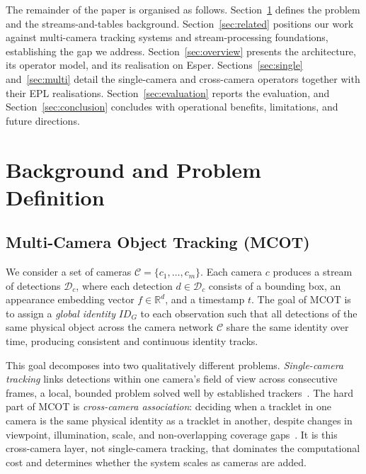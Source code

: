 \documentclass[5p,times]{elsarticle}
\begin{document}
The remainder of the paper is organised as follows. Section~\ref{sec:background} defines the
problem and the streams-and-tables background. Section~\ref{sec:related} positions our work
against multi-camera tracking systems and stream-processing foundations, establishing the gap
we address. Section~\ref{sec:overview} presents the architecture, its operator model, and its
realisation on Esper. Sections~\ref{sec:single} and~\ref{sec:multi} detail the single-camera
and cross-camera operators together with their EPL realisations.
Section~\ref{sec:evaluation} reports the evaluation, and Section~\ref{sec:conclusion} concludes
with operational benefits, limitations, and future directions.

\section{Background and Problem Definition}\label{sec:background}

\subsection{Multi-Camera Object Tracking (MCOT)}
\label{sec:background:mcot}

We consider a set of cameras $\mathcal{C} = \{c_1,\dots,c_m\}$. Each camera $c$ produces a stream of detections $\mathcal{D}_c$, where each detection $d \in \mathcal{D}_c$ consists of a bounding box, an appearance embedding vector $f \in \mathbb{R}^{d}$, and a timestamp $t$. The goal of MCOT is to assign a \emph{global identity} $ID_G$ to each observation such that all detections of the same physical object across the camera network $\mathcal{C}$ share the same identity over time, producing consistent and continuous identity tracks.

This goal decomposes into two qualitatively different problems. \emph{Single-camera tracking} links detections within one camera's field of view across consecutive frames, a local, bounded problem solved well by established trackers~\cite{Bewley2016_sort,Wojke2017_deepsort,zhang2022bytetrack}. 
The hard part of MCOT is \emph{cross-camera association}: deciding when a tracklet in one camera is the same physical identity as a tracklet in another, despite changes in viewpoint, illumination, scale, and non-overlapping coverage gaps~\cite{ye2021deep,ristani2016performance}. 
It is this cross-camera layer, not single-camera tracking, that dominates the computational cost and determines whether the system scales as cameras are added.
\end{document}
